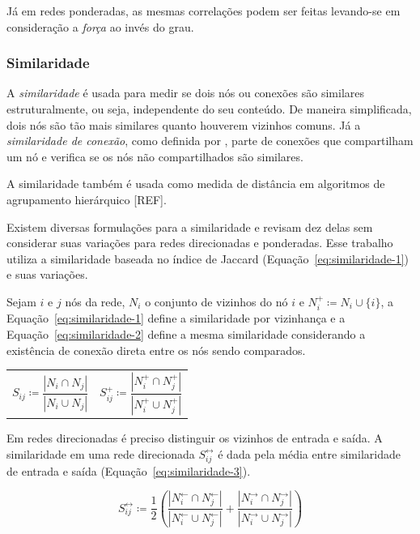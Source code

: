 \documentclass[12pt,a4paper,final]{article}
\newcommand{\defn}{\coloneqq} %
\newcommand{\linkin}[1]{#1^\leftarrow} %
\newcommand{\linkout}[1]{#1^\rightarrow} %
\newcommand{\linkboth}[1]{#1^\leftrightarrow} %
\begin{document}
Já em redes ponderadas, as mesmas correlações podem ser feitas levando-se em consideração a \textit{força} ao invés do grau.

\subsubsection{Similaridade}

A \textit{similaridade} é usada para medir se dois nós ou conexões são similares estruturalmente, ou seja, independente do seu conteúdo. De maneira simplificada, dois nós são tão mais similares quanto houverem vizinhos comuns. Já a \textit{similaridade de conexão}, como definida por , parte de conexões que compartilham um nó e verifica se os nós não compartilhados são similares.

A similaridade também é usada como medida de distância em algoritmos de agrupamento hierárquico [REF].

Existem diversas formulações para a similaridade e  revisam dez delas sem considerar suas variações para redes direcionadas e ponderadas. Esse trabalho utiliza a similaridade baseada no índice de Jaccard (Equação~\ref{eq:similaridade-1}) e suas variações.

Sejam $i$ e $j$ nós da rede, $N_i$ o conjunto de vizinhos do nó $i$ e $N_i^+ \defn N_i \cup \{i\}$, a Equação~\ref{eq:similaridade-1} define a similaridade por vizinhança e a Equação~\ref{eq:similaridade-2} define a mesma similaridade considerando a existência de conexão direta entre os nós sendo comparados.

\noindent
\begin{tabularx}{\linewidth}{@{}XX@{}}
    \begin{equation} \label{eq:similaridade-1}
        S_{ij} \defn \frac{|N_i \cap N_j|}{|N_i \cup N_j|} 
    \end{equation} &
    \begin{equation} \label{eq:similaridade-2}
        S_{ij}^+ \defn \frac{|N_i^+ \cap N_j^+|}{|N_i^+ \cup N_j^+|} 
    \end{equation}
\end{tabularx}

Em redes direcionadas é preciso distinguir os vizinhos de entrada e saída. A similaridade em uma rede direcionada $\linkboth{S}_{ij}$ é dada pela média entre similaridade de entrada e saída (Equação~\ref{eq:similaridade-3}).

\begin{equation} \label{eq:similaridade-3}
    \linkboth{S}_{ij} \defn \frac{1}{2} \left( \frac{|\linkin{N}_i \cap \linkin{N}_j|}{|\linkin{N}_i \cup \linkin{N}_j|} + \frac{|\linkout{N}_i \cap \linkout{N}_j|}{|\linkout{N}_i \cup \linkout{N}_j|} \right)
\end{equation}
\end{document}
